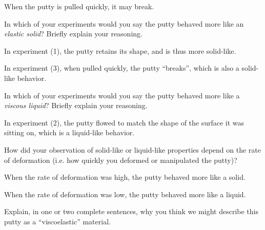 \begin{activity}
\begin{model}
\begin{enumerate}
\begin{itemize}
\begin{solution}[1in]
					When the putty is pulled quickly, it may break.
					
				\end{solution}
			\end{itemize}
		
	\end{enumerate}

\end{model}


\begin{ctqs}

	\question In which of your experiments would you say the putty behaved more like an \emph{elastic solid}?  Briefly explain your reasoning.
	
		\begin{solution}[1.25in]
		
			In experiment (1), the putty retains its shape, and is thus more solid-like.
			
			In experiment (3), when pulled quickly, the putty ``breaks'', which is also a solid-like behavior.
		
		\end{solution}
	
	\question In which of your experiments would you say the putty behaved more like a \emph{viscous liquid}?  Briefly explain your reasoning.
	
		\begin{solution}[1in]
		
			In experiment (2), the putty flowed to match the shape of the surface it was sitting on, which is a liquid-like behavior.
		
		\end{solution}
	
	\question How did your observation of solid-like or liquid-like properties depend on the rate of deformation (i.e. how quickly you deformed or manipulated the putty)?
	
		\begin{solution}[1in]
		
			When the rate of deformation was high, the putty behaved more like a solid.
			
			When the rate of deformation was low, the putty behaved more like a liquid.
			
		\end{solution}
		
	\question Explain, in one or two complete sentences, why you think we might describe this putty as a ``viscoelastic'' material.
	
			\begin{solution}[1.5in]
			

\end{solution}
\end{ctqs}
\end{activity}
